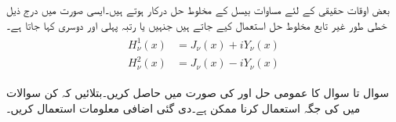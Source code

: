 بعض اوقات حقیقی  کے لئے مساوات بیسل کے مخلوط حل درکار ہوتے ہیں۔ایسی صورت میں درج ذیل خطی طور غیر تابع مخلوط حل  استعمال کیے جاتے ہیں جنہیں  یا رتبہ  پہلی اور دوسری  کہا جاتا ہے۔
\begin{gather}
\begin{aligned}\label{مساوات_بیسل_ہینکل}
H_{\nu}^1(x)&=J_{\nu}(x)+iY_{\nu}(x)\\
H_{\nu}^2(x)&=J_{\nu}(x)-iY_{\nu}(x)
\end{aligned}
\end{gather}

سوال  تا سوال  کا عمومی حل  اور  کی صورت میں حاصل کریں۔بتلائیں کہ کن سوالات میں  کی جگہ  استعمال کرنا ممکن ہے۔دی گئی اضافی معلومات استعمال کریں۔


